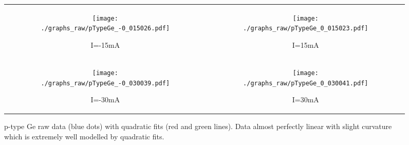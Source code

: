 \documentclass[a4paper]{article}
\begin{document}
	\begin{figure}[h!]
		\centering
		\begin{tabular}{c|c}
			\begin{subfigure}[t]{0.45\textwidth}
				\centering
				\texttt{[image: ./graphs\_raw/pTypeGe\_-0\_015026.pdf]}
				\caption{I=-15mA}
				\label{fig:pTypeRawGraph-15mA}
			\end{subfigure}
			&
			\begin{subfigure}[t]{0.45\textwidth}
				\centering
				\texttt{[image: ./graphs\_raw/pTypeGe\_0\_015023.pdf]}
				\caption{I=15mA}
				\label{fig:pTypeRawGraph15mA}
			\end{subfigure}
			\\
			\begin{subfigure}[t]{0.45\textwidth}
				\centering
				\texttt{[image: ./graphs\_raw/pTypeGe\_-0\_030039.pdf]}
				\caption{I=-30mA}
				\label{fig:pTypeRawGraph-30mA}
			\end{subfigure}
			&
			\begin{subfigure}[t]{0.45\textwidth}
				\centering
				\texttt{[image: ./graphs\_raw/pTypeGe\_0\_030041.pdf]}
				\caption{I=30mA}
				\label{fig:pTypeRawGraph30mA}
			\end{subfigure}
		\end{tabular}
		\caption{p-type Ge raw data (blue dots) with quadratic fits (red and green lines). Data almost perfectly linear with slight curvature which is extremely well modelled by quadratic fits.}
		\label{fig:pTypeRawGraphs}
	\end{figure}
	
\end{document}
